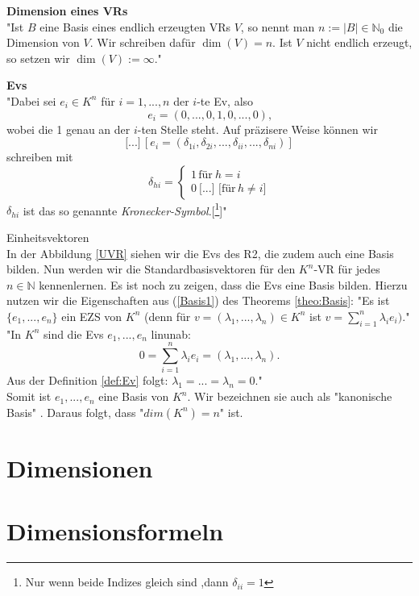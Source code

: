 \theoremstyle{definition}
\begin{definition}{\textbf{Dimension eines \acl{VR}s}}
	\\"Ist $B$ eine Basis eines endlich erzeugten \acl{VR}s $V$, so nennt man $n := |B| \in \mathbb{N}_0$ die Dimension von $V$. Wir schreiben dafür $\dim(V)= n$. Ist $V$ nicht endlich erzeugt, so setzen wir $\dim(V):= \infty$." \cite[S. 504]{Enzy}
\end{definition}

\theoremstyle{definition}
	\label{def:Ev}
	\begin{definition}{\textbf{\aclp{Ev}}}
	\\"Dabei sei $e_i \in K^n$ für $i = 1,...,n$ der $i$-te \acl{Ev}, also 
	\[e_i = (0,...,0,1,0,...,0)\text{,}\]
	wobei die 1 genau an der $i$-ten Stelle steht. Auf präzisere Weise können wir
	\[\text{[...]} \, [e_i = (\delta_{1i},\delta_{2i},...,\delta_{ii},...,\delta_{ni})]\]%
	schreiben mit 
	\[\delta_{hi}= \begin{cases} 1 \, \text{für} \: h = i \\ 0 \: \text{[...] [für} \, h\not=i] \end{cases}\]
	$\delta_{hi}$ ist das so genannte \emph{Kronecker-Symbol}.[\footnote{Nur wenn beide Indizes gleich sind ,dann $\delta_{ii}=1$}]" \cite[S. 31]{Bosch}
	\end{definition} 

\theoremstyle{example}
\begin{example}{Einheitsvektoren}
\\ In der Abbildung \ref{UVR} siehen wir die \aclp{Ev} des \acl{R2}, die zudem auch eine Basis bilden. Nun werden wir die Standardbasisvektoren für den $K^n$-\acl{VR} für jedes $n \in \mathbb{N}$ kennenlernen.
Es ist noch zu zeigen, dass die \aclp{Ev} eine Basis bilden. Hierzu nutzen wir die Eigenschaften aus (\ref{Basis1}) des Theorems \ref{theo:Basis}:
"Es ist $\{e_1,...,e_n\}$ ein \acl{EZS} von $K^n$ (denn für $v =(\lambda_1,...,\lambda_n) \in K^n$ ist $v = \sum \limits_{i=1}^{n} \lambda_i e_i)$.\grqq" \cite[S. 40, 9.9]{Skript}
\\"In $K^n$ sind die \aclp{Ev} $e_1,...,e_n$ \acl{linunab}: \[0=\sum \limits_{i=1}^{n} \lambda_i e_i = (\lambda_1,...,\lambda_n)\text{.}\]
Aus der Definition \ref{def:Ev} folgt: $\lambda_1=...=\lambda_n=0$." \cite[S. 41, 9.14]{S. 41}
\\ Somit ist ${e_1,...,e_n}$ eine Basis von $K^n$. Wir bezeichnen sie auch als "kanonische Basis" \cite[S. 42, 9.17]{Skript} . Daraus folgt, dass "$dim(K^n) = n$" \cite[S. 44, 9.24 (a)]{Skript} ist.
\end{example}

\section{Dimensionen}
\label{sec:Dimensionen}


\section{Dimensionsformeln}
\label{sec:Dim.formel}
